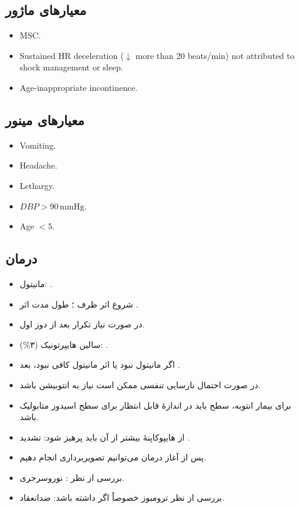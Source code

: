 \documentclass[12pt,a4paper]{article}
\begin{document}
\subsection*{معیارهای ماژور}
\begin{latin}
\begin{itemize}
\item MSC.
\item Sustained HR deceleration (\(\downarrow\) more than 20 beats/min) not attributed to shock management or sleep.
\item Age-inappropriate incontinence.
\end{itemize}
\end{latin}
\subsection*{معیارهای مینور}
\begin{latin}
\begin{itemize}
\item Vomiting.
\item Headache.
\item Lethargy.
\item \(DBP>90\,\mathrm{mmHg}\).
\item Age \(<5\).
\end{itemize}
\end{latin}

\subsection*{درمان }
\begin{itemize}
\item مانیتول: .
\item شروع اثر ظرف ؛ طول مدت اثر .
\item در صورت نیاز تکرار  بعد از دوز اول.
\item سالین هایپرتونیک (۳\%): .
\item اگر مانیتول نبود یا اثر مانیتول کافی نبود، بعد .
\item در صورت احتمال نارسایی تنفسی ممکن است نیاز به انتوبیشن باشد.
\item برای بیمار انتوبه، سطح  باید در اندازهٔ قابل انتظار برای سطح اسیدوز متابولیک باشد.
\item از هایپوکاپنهٔ بیشتر از آن باید پرهیز شود: تشدید .
\item پس از آغاز درمان می‌توانیم تصویربرداری انجام دهیم.
\item بررسی از نظر : نوروسرجری.
\item بررسی از نظر ترومبوز خصوصاً اگر  داشته باشد: ضدانعقاد.
\end{itemize}
\end{document}
